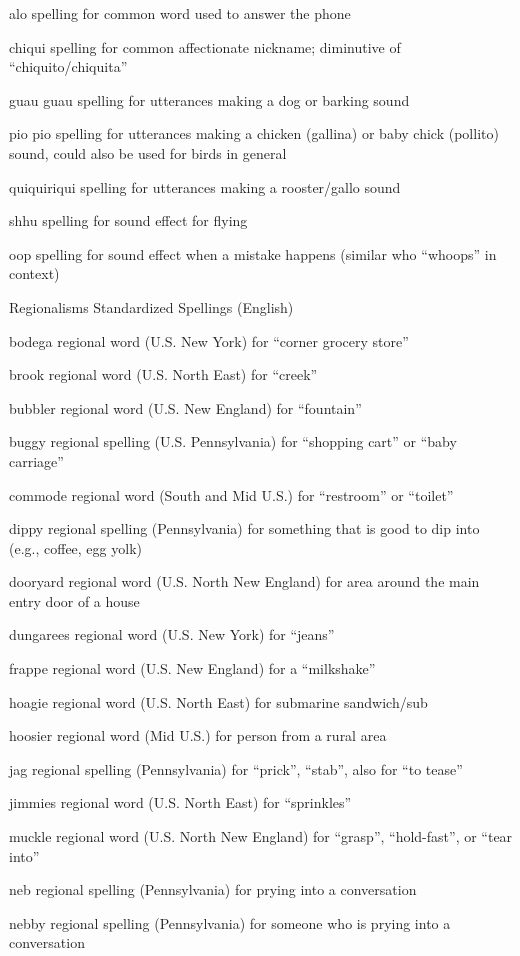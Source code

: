 \documentclass[
  12pt,
]{book}
\begin{document}
alo
spelling for common word used to answer the phone

chiqui
spelling for common affectionate nickname; diminutive of ``chiquito/chiquita''

guau guau
spelling for utterances making a dog or barking sound

pio pio
spelling for utterances making a chicken (gallina) or baby chick (pollito) sound, could also be used for birds in general

quiquiriqui
spelling for utterances making a rooster/gallo sound

shhu
spelling for sound effect for flying

oop
spelling for sound effect when a mistake happens (similar who ``whoops'' in context)

Regionalisms Standardized Spellings (English)

bodega
regional word (U.S. New York) for ``corner grocery store''

brook
regional word (U.S. North East) for ``creek''

bubbler
regional word (U.S. New England) for ``fountain''

buggy
regional spelling (U.S. Pennsylvania) for ``shopping cart'' or ``baby carriage''

commode
regional word (South and Mid U.S.) for ``restroom'' or ``toilet''

dippy
regional spelling (Pennsylvania) for something that is good to dip into (e.g., coffee, egg yolk)

dooryard
regional word (U.S. North New England) for area around the main entry door of a house

dungarees
regional word (U.S. New York) for ``jeans''

frappe
regional word (U.S. New England) for a ``milkshake''

hoagie
regional word (U.S. North East) for submarine sandwich/sub

hoosier
regional word (Mid U.S.) for person from a rural area

jag
regional spelling (Pennsylvania) for ``prick'', ``stab'', also for ``to tease''

jimmies
regional word (U.S. North East) for ``sprinkles''

muckle
regional word (U.S. North New England) for ``grasp'', ``hold-fast'', or ``tear into''

neb
regional spelling (Pennsylvania) for prying into a conversation

nebby
regional spelling (Pennsylvania) for someone who is prying into a conversation
\end{document}
